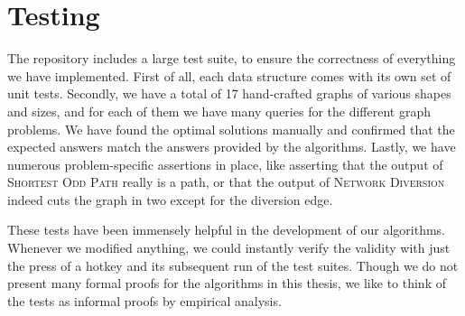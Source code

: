 \section{Testing}
The repository includes a large test suite, to ensure the correctness of everything we have implemented. First of all, each data structure comes with its own set of unit tests. Secondly, we have a total of 17 hand-crafted graphs of various shapes and sizes, and for each of them we have many queries for the different graph problems. We have found the optimal solutions manually and confirmed that the expected answers match the answers provided by the algorithms. Lastly, we have numerous problem-specific assertions in place, like asserting that the output of \textsc{Shortest Odd Path} really is a path, or that the output of \textsc{Network Diversion} indeed cuts the graph in two except for the diversion edge.

These tests have been immensely helpful in the development of our algorithms. Whenever we modified anything, we could instantly verify the validity with just the press of a hotkey and its subsequent run of the test suites. Though we do not present many formal proofs for the algorithms in this thesis, we like to think of the tests as informal proofs by empirical analysis.
